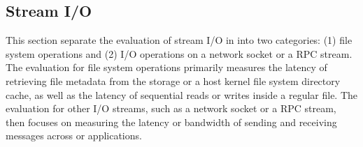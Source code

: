 \subsection{Stream I/O}
\label{sec:eval:pal:stream}

This section separate the evaluation of stream I/O in \thehostabi{} into 
two categories:
(1) file system operations and (2) I/O operations on a network socket or a RPC stream.
The evaluation for file system operations
primarily measures
the latency of retrieving file metadata from the storage or a host kernel file system directory cache,
as well as the latency of sequential reads or writes
inside a regular file.
The evaluation for other I/O streams, such as a network socket or a RPC stream,
then focuses on measuring the latency or bandwidth
of sending and receiving messages 
across \picoprocs{} or applications.







